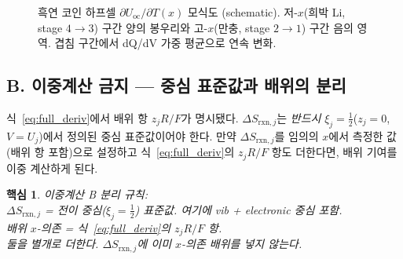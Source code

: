 \documentclass[11pt,a4paper]{article}
\newtheorem*{keybox}{핵심}
\newcommand{\rxn}{\mathrm{rxn}}
\newcommand{\oc}{\mathrm{oc}}
\begin{document}
\begin{figure}[h]
\centering
{}
\caption{흑연 코인 하프셀 $\partial U_{\oc}/\partial T(x)$ 모식도 (schematic).
저-$x$(희박 Li, stage $4\to3$) 구간 양의 봉우리와
고-$x$(만충, stage $2\to1$) 구간 음의 영역.
겹침 구간에서 dQ/dV 가중 평균으로 연속 변화.}
\label{fig:dUdT_schematic}
\end{figure}

\subsection{B. 이중계산 금지 --- 중심 표준값과 배위의 분리}\label{sec:mixing_B}

식~\eqref{eq:full_deriv}에서 배위 항 $z_j R/F$가 명시됐다.
$\Delta S_{\rxn,j}$는 \emph{반드시} $\xi_j=\frac{1}{2}$($z_j=0$, $V=U_j$)에서 정의된 중심 표준값이어야 한다.
만약 $\Delta S_{\rxn,j}$를 임의의 $x$에서 측정한 값(배위 항 포함)으로 설정하고
식~\eqref{eq:full_deriv}의 $z_jR/F$ 항도 더한다면, 배위 기여를 이중 계산하게 된다.

\begin{keybox}
이중계산 B 분리 규칙:\\
$\Delta S_{\rxn,j}$ = 전이 중심($\xi_j=\frac{1}{2}$) 표준값. 여기에 vib + electronic 중심 포함.\\
배위 $x$-의존 = 식~\eqref{eq:full_deriv}의 $z_jR/F$ 항.\\
둘을 \emph{별개}로 더한다. $\Delta S_{\rxn,j}$에 이미 $x$-의존 배위를 넣지 않는다.
\end{keybox}
\end{document}
